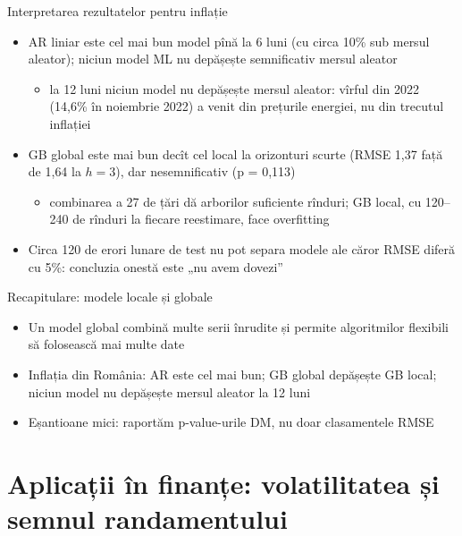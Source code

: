 \begin{frame}{Interpretarea rezultatelor pentru inflație}
\itemsize{\small}
\begin{itemize}
    \item AR liniar este cel mai bun model pînă la 6 luni (cu circa 10\% sub mersul aleator); niciun model ML nu depășește semnificativ mersul aleator
    \begin{itemize}
        \item la 12 luni niciun model nu depășește mersul aleator: vîrful din 2022 (14{,}6\% în noiembrie 2022) a venit din prețurile energiei, nu din trecutul inflației
    \end{itemize}
    \item GB global este mai bun decît cel local la orizonturi scurte (RMSE 1{,}37 față de 1{,}64 la $h = 3$), dar nesemnificativ (p = 0{,}113)
    \begin{itemize}
        \item combinarea a 27 de țări dă arborilor suficiente rînduri; GB local, cu 120--240 de rînduri la fiecare reestimare, face overfitting
    \end{itemize}
    \item Circa 120 de erori lunare de test nu pot separa modele ale căror RMSE diferă cu 5\%: concluzia onestă este „nu avem dovezi”
\end{itemize}
\end{frame}

\begin{frame}{Recapitulare: modele locale și globale}
\itemsize{\small}
\begin{itemize}
    \item Un model global combină multe serii înrudite și permite algoritmilor flexibili să folosească mai multe date
    \item Inflația din România: AR este cel mai bun; GB global depășește GB local; niciun model nu depășește mersul aleator la 12 luni
    \item Eșantioane mici: raportăm p-value-urile DM, nu doar clasamentele RMSE
\end{itemize}
\end{frame}


\section{Aplicații în finanțe: volatilitatea și semnul randamentului}

